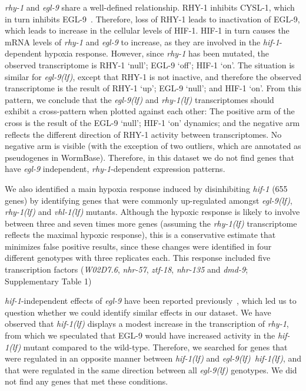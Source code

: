 \documentclass[9pt,twocolumn,twoside,lineno]{pnas-new}
\newcommand{\gene}[1]{\emph{#1}}
\newcommand{\nhr}{\emph{\mbox{nhr-57}}}
\newcommand{\egl}{\emph{\mbox{egl-9}(lf)}}
\newcommand{\rhy}{\emph{\mbox{rhy-1}(lf)}}
\newcommand{\vhl}{\emph{\mbox{vhl-1}(lf)}}
\newcommand{\eglhif}{\emph{\mbox{egl-9(lf)}~\mbox{hif-1(lf)}}}
\newcommand{\hif}{\emph{\mbox{hif-1(lf)}}}
\newcommand{\eglp}{EGL-9}
\newcommand{\rhyp}{RHY-1}
\newcommand{\hifp}{HIF-1}
\newcommand{\cyslp}{CYSL-1}
\begin{document}
\gene{rhy-1} and \gene{egl-9} share a well-defined relationship. \rhyp{}
inhibits \cyslp{}, which in turn inhibits \eglp{}~\cite{Ma2012}. Therefore, loss
of \rhyp{} leads to inactivation of \eglp{}, which leads to increase in the
cellular levels of \hifp{}. \hifp{} in turn causes the mRNA levels of
\gene{rhy-1} and \gene{egl-9} to increase, as they are involved in the
\gene{hif-1}-dependent hypoxia response. However, since \gene{rhy-1} has been
mutated, the observed transcriptome is \rhyp{} `null'; \eglp{} `off'; \hifp{}
`on'. The situation is similar for \egl{}, except that \rhyp{} is not inactive,
and therefore the observed transcriptome is the result of \rhyp{} `up'; \eglp{}
`null'; and \hifp{} `on'. From this pattern, we conclude that the \egl{} and
\rhy{} transcriptomes should exhibit a cross-pattern when plotted against each
other: The positive arm of the cross is the result of the \eglp{} `null';
\hifp{} `on' dynamics; and the negative arm reflects the different direction of
\rhyp{} activity between transcriptomes. No negative arm is visible (with the
exception of two outliers, which are annotated as pseudogenes in WormBase).
Therefore, in this dataset we do not find genes that have \gene{egl-9}
independent, \gene{rhy-1}-dependent expression patterns.

We also identified a main hypoxia response induced by disinhibiting
\gene{hif-1} (655 genes) by identifying genes that were commonly up-regulated
amongst \egl{}, \rhy{} and \vhl{} mutants. Although the hypoxic response is
likely to involve between three and seven times more genes (assuming the \rhy{}
transcriptome reflects the maximal hypoxic response), this is a conservative
estimate that minimizes false positive results, since these changes were
identified in four different genotypes with three replicates each. This response
included five transcription factors (\gene{W02D7.6}, \nhr{}, \gene{ztf-18},
\gene{nhr-135} and \gene{dmd-9}; Supplementary Table 1)

\gene{hif-1}-independent effects of \gene{egl-9} have been reported
previously~\cite{Park2012}, which led us to question whether we could identify
similar effects in our dataset. We have observed that \hif{} displays a modest
increase in the transcription of \gene{rhy-1}, from which we speculated that
\eglp{} would have increased activity in the \hif{} mutant compared to the
wild-type. Therefore, we searched for genes that were regulated in an opposite
manner between \hif{} and \eglhif{}, and that were regulated in the same
direction between all \egl{} genotypes. We did not find any genes that met these
conditions.
\end{document}
